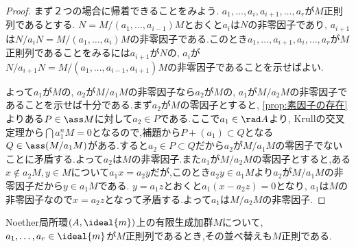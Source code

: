 \begin{proof}
	まず２つの場合に帰着できることをみよう. $a_1,\dots,a_i,a_{i+1},\dots,a_r$が$M$正則列であるとする. $N=M/(a_1,\dots,a_{i-1})M$とおくと$a_i$は$N$の非零因子であり, $a_{i+1}$は$N/a_iN=M/(a_1,\dots,a_i)M$の非零因子である.このとき$a_1,\dots,a_{i+1},a_i,\dots,a_r$が$M$正則列であることをみるには$a_{i+1}$が$N$の, $a_i$が$N/a_{i+1}N=M/(a_1,\dots,a_{i-1},a_{i+1})M$の非零因子であることを示せばよい.
	
	よって$a_1$が$M$の, $a_2$が$M/a_1M$の非零因子なら$a_2$が$M$の, $a_1$が$M/a_2M$の非零因子であることを示せば十分である.まず$a_2$が$M$の零因子とすると, \ref{prop:素因子の存在}よりある$P\in\ass M$に対して$a_2\in P$である.ここで$a_1\in\rad A$より, Krullの交叉定理から$\bigcap a_1^nM=0$となるので,補題から$P+(a_1)\subset Q$となる$Q\in\ass (M/a_1M)$がある.すると$a_2\in P\subset Q$だから$a_2$が$M/a_1M$の零因子でないことに矛盾する.よって$a_2$は$M$の非零因子.また$a_1$が$M/a_2M$の零因子とすると,ある$x\not\in a_2M,y\in M$について$a_1x=a_2y$だが,このとき$a_2y\in a_1M$より$a_2$が$M/a_1M$の非零因子だから$y\in a_1M$である. $y=a_1z$とおくと$a_1(x-a_2z)=0$となり, $a_1$は$M$の非零因子なので$x=a_2z$となって矛盾する.よって$a_1$は$M/a_2M$の非零因子.
\end{proof}

\begin{cor}
	Noether局所環$(A,\ideal{m})$上の有限生成加群$M$について, $a_1,\dots,a_r\in\ideal{m}$が$M$正則列であるとき,その並べ替えも$M$正則である.
\end{cor}

